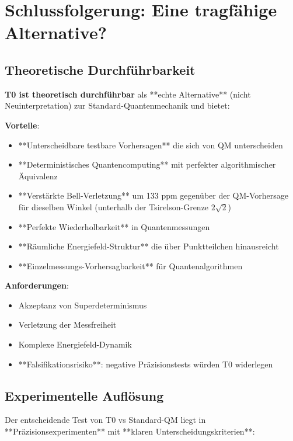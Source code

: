 	\section{Schlussfolgerung: Eine tragfähige Alternative?}
	
	\subsection{Theoretische Durchführbarkeit}
	
	\textbf{T0 ist theoretisch durchführbar} als **echte Alternative** (nicht Neuinterpretation) zur Standard-Quantenmechanik und bietet:
	
	\textbf{Vorteile}:
	\begin{itemize}
		\item **Unterscheidbare testbare Vorhersagen** die sich von QM unterscheiden
		\item **Deterministisches Quantencomputing** mit perfekter algorithmischer Äquivalenz
		\item **Verstärkte Bell-Verletzung** um 133 ppm gegenüber der QM-Vorhersage für dieselben Winkel (unterhalb der Tsirelson-Grenze $2\sqrt2$)
		\item **Perfekte Wiederholbarkeit** in Quantenmessungen
		\item **Räumliche Energiefeld-Struktur** die über Punktteilchen hinausreicht
		\item **Einzelmessungs-Vorhersagbarkeit** für Quantenalgorithmen
	\end{itemize}
	
	\textbf{Anforderungen}:
	\begin{itemize}
		\item Akzeptanz von Superdeterminismus
		\item Verletzung der Messfreiheit
		\item Komplexe Energiefeld-Dynamik
		\item **Falsifikationsrisiko**: negative Präzisionstests würden T0 widerlegen
	\end{itemize}
	
	\subsection{Experimentelle Auflösung}
	
	Der entscheidende Test von T0 vs Standard-QM liegt in **Präzisionsexperimenten** mit **klaren Unterscheidungskriterien**:
	
